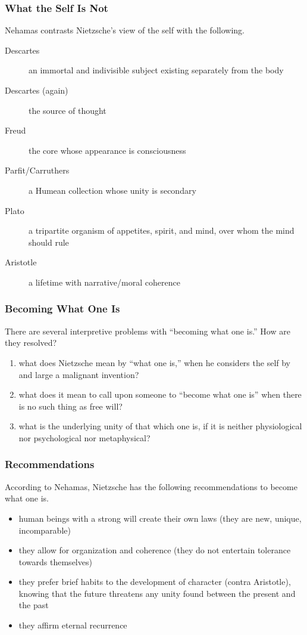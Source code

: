 \documentclass[xcolor=dvipsnames]{beamer}
\begin{document}
\begin{frame}
  \frametitle{What the Self Is Not}
  Nehamas contrasts Nietzsche's view of the self with the following.
  \begin{description}
  \item[Descartes] an immortal and indivisible subject existing
    separately from the body
  \item[Descartes (again)] the source of thought
  \item[Freud] the core whose appearance is consciousness
  \item[Parfit/Carruthers] a Humean collection whose unity is
    secondary
  \item[Plato] a tripartite organism of appetites, spirit, and mind,
    over whom the mind should rule
  \item[Aristotle] a lifetime with narrative/moral coherence
  \end{description}
\end{frame}

\begin{frame}
  \frametitle{Becoming What One Is}
  There are several interpretive problems with ``becoming what one
  is.'' How are they resolved?
  \begin{enumerate}
  \item what does Nietzsche mean by ``what one is,'' when he considers
    the self by and large a malignant invention?
  \item what does it mean to call upon someone to ``become what one
    is'' when there is no such thing as free will?
  \item what is the underlying unity of that which one is, if it is
    neither physiological nor psychological nor metaphysical?
  \end{enumerate}
\end{frame}

\begin{frame}
  \frametitle{Recommendations}
  According to Nehamas, Nietzsche has the following recommendations to
  become what one is.
  \begin{itemize}
  \item human beings with a strong will create their own laws (they are new, unique, incomparable)
  \item they allow for organization and coherence (they do not
    entertain tolerance towards themselves)
  \item they prefer brief habits to the development of character
    (contra Aristotle), knowing that the future threatens any unity
    found between the present and the past
  \item they affirm eternal recurrence  \end{itemize}
\end{frame}
\end{document}
